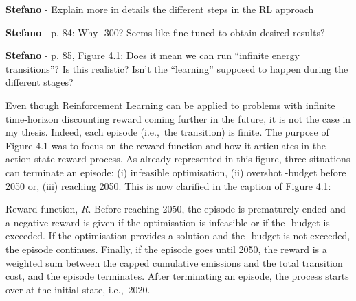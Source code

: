 \documentclass[12pt,a4paper]{article}
\def\ie{i.e.,\ }
\begin{document}
\begin{mdframed}[style=comment] %
{\color{orange} \textbf{Stefano}} - Explain more in details the different steps in the RL approach
\end{mdframed}

\noindent 

\begin{mdframed}[style=manuscript] %

\end{mdframed}

\begin{mdframed}[style=comment] %
{\color{orange} \textbf{Stefano}} - p. 84: Why -300? Seems like fine-tuned to obtain desired results?
\end{mdframed}

\noindent 

\begin{mdframed}[style=manuscript] %

\end{mdframed}

\begin{mdframed}[style=comment] %
{\color{orange} \textbf{Stefano}} - p. 85, Figure 4.1: Does it mean we can run ``infinite energy transitions''? Is this realistic? Isn’t the ``learning'' supposed to happen during the different stages?
\end{mdframed}

\noindent Even though Reinforcement Learning can be applied to problems with infinite time-horizon discounting reward coming further in the future, it is not the case in my thesis. Indeed, each episode (\ie the transition) is finite. The purpose of Figure 4.1 was to focus on the reward function and how it articulates in the action-state-reward process. As already represented in this figure, three situations can terminate an episode: (i) infeasible optimisation, (ii) overshot -budget before 2050 or, (iii) reaching 2050. This is now clarified {\color{blue}in the caption of Figure 4.1}:

\begin{mdframed}[style=manuscript] %
Reward function, $R$. Before reaching 2050, the episode is prematurely ended and a negative reward is given if the optimisation is infeasible or if the -budget is exceeded. If the optimisation provides a solution and the -budget is not exceeded, the episode continues. Finally, if the episode goes until 2050, the reward is a weighted sum between the capped cumulative emissions and the total transition cost, and the episode terminates. After terminating an episode, the process starts over at the initial state, \ie 2020.
\end{mdframed}
\end{document}

